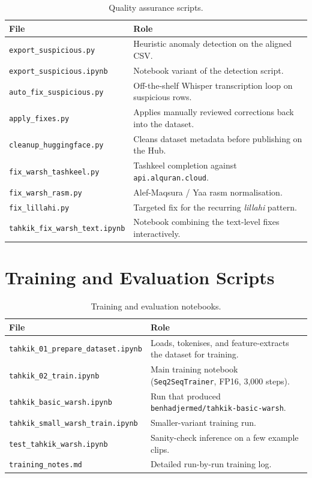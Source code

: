 \begin{table}[H]
  \centering
  \caption{Quality assurance scripts.}
  \label{tab:mt_app_qa}
  \renewcommand{\arraystretch}{1.3}
  \begin{tabular}{lp{8cm}}
    \toprule
    \textbf{File} & \textbf{Role} \\
    \midrule
    \texttt{export\_suspicious.py}      & Heuristic anomaly detection on the aligned CSV. \\
    \texttt{export\_suspicious.ipynb}   & Notebook variant of the detection script. \\
    \texttt{auto\_fix\_suspicious.py}   & Off-the-shelf Whisper transcription loop on suspicious rows. \\
    \texttt{apply\_fixes.py}            & Applies manually reviewed corrections back into the dataset. \\
    \texttt{cleanup\_huggingface.py}    & Cleans dataset metadata before publishing on the Hub. \\
    \texttt{fix\_warsh\_tashkeel.py}    & Tashkeel completion against \texttt{api.alquran.cloud}. \\
    \texttt{fix\_warsh\_rasm.py}        & Alef-Maqsura / Yaa rasm normalisation. \\
    \texttt{fix\_lillahi.py}            & Targeted fix for the recurring \emph{lillahi} pattern. \\
    \texttt{tahkik\_fix\_warsh\_text.ipynb} & Notebook combining the text-level fixes interactively. \\
    \bottomrule
  \end{tabular}
\end{table}

\section{Training and Evaluation Scripts}

\begin{table}[H]
  \centering
  \caption{Training and evaluation notebooks.}
  \label{tab:mt_app_training}
  \renewcommand{\arraystretch}{1.3}
  \begin{tabular}{lp{8cm}}
    \toprule
    \textbf{File} & \textbf{Role} \\
    \midrule
    \texttt{tahkik\_01\_prepare\_dataset.ipynb}  & Loads, tokenises, and feature-extracts the dataset for training. \\
    \texttt{tahkik\_02\_train.ipynb}             & Main training notebook (\texttt{Seq2SeqTrainer}, FP16, 3{,}000 steps). \\
    \texttt{tahkik\_basic\_warsh.ipynb}          & Run that produced \texttt{benhadjermed/tahkik-basic-warsh}. \\
    \texttt{tahkik\_small\_warsh\_train.ipynb}   & Smaller-variant training run. \\
    \texttt{test\_tahkik\_warsh.ipynb}           & Sanity-check inference on a few example clips. \\
    \texttt{training\_notes.md}                  & Detailed run-by-run training log. \\
    \bottomrule
  \end{tabular}
\end{table}

